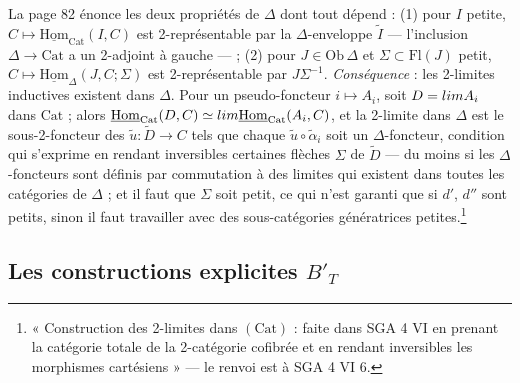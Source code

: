 \documentclass[11pt,a4paper]{article}
\begin{document}
La page 82 énonce les deux propriétés de $\Delta$ dont tout dépend :
(1) pour $I$ petite, $C \mapsto \underline{\mathrm{Hom}}_{\mathrm{Cat}}(I, C)$
est 2-représentable par la $\Delta$-enveloppe $\widetilde{I}$ — l'inclusion
$\Delta \to \mathrm{Cat}$ a un 2-adjoint à gauche — ; (2) pour $J \in
\mathrm{Ob}\,\Delta$ et $\Sigma \subset \mathrm{Fl}(J)$ petit, $C \mapsto
\underline{\mathrm{Hom}}_{\Delta}(J, C ; \Sigma)$ est 2-représentable par
$J\Sigma^{-1}$. \emph{Conséquence} : les 2-limites inductives existent
dans $\Delta$. Pour un pseudo-foncteur $i \mapsto A_{i}$, soit $D =
\varinjlim A_{i}$ dans $\mathrm{Cat}$ ; alors $\underline{\mathrm{Hom}}_{
\mathrm{Cat}}(D, C) \simeq \varprojlim \underline{\mathrm{Hom}}_{\mathrm{Cat}}
(A_{i}, C)$, et la 2-limite dans $\Delta$ est le sous-2-foncteur des
$\tilde{u} : \widetilde{D} \to C$ tels que chaque $\tilde{u} \circ
\tilde\alpha_{i}$ soit un $\Delta$-foncteur, condition qui s'exprime en
rendant inversibles certaines flèches $\Sigma$ de $\widetilde{D}$ — du
moins si les $\Delta$-foncteurs sont définis par commutation à des limites
qui existent dans toutes les catégories de $\Delta$ ; et il faut que
$\Sigma$ soit petit, ce qui n'est garanti que si $d'$, $d''$ sont petits,
sinon il faut travailler avec des sous-catégories génératrices
petites.\footnote{« Construction des 2-limites dans $(\mathrm{Cat})$ : faite
dans SGA 4 VI en prenant la catégorie totale de la 2-catégorie cofibrée
et en rendant inversibles les morphismes cartésiens » — le renvoi est à
SGA 4 VI 6.}

\subsection*{Les constructions explicites $B'_{T}$}
\end{document}
